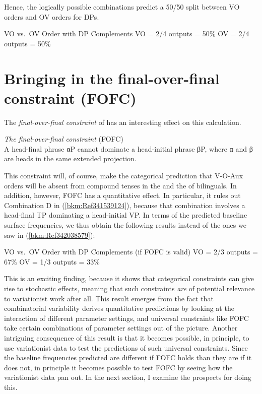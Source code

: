 \documentclass[output=paper]{langsci/langscibook}
\begin{document}
Hence, the logically possible combinations predict a 50/50 split between VO
orders and OV orders for DPs.

\ea\label{bkm:Ref342038579}VO vs.\ OV Order with DP Complements
    \sn VO = 2/4 outputs = 50\%
    \sn OV = 2/4 outputs = 50\%
\z

\section{Bringing in the final-over-final constraint (FOFC)}\label{sec-30:key:2}

The \emph{final-over-final constraint} of \textcite[171]{BibHolRob2014} has an
interesting effect on this calculation.

\ea \emph{The final-over-final constraint} (FOFC)\\
    A head-final phrase αP cannot dominate a head-initial phrase βP, where α
    and β are heads in the same extended projection.
\z

This constraint will, of course, make the categorical prediction that V-O-Aux
orders will be absent from compound tenses in the  and the  of
bilinguals.  In addition, however, \gls{FOFC} has a quantitative effect.  In
particular, it rules out Combination D in (\ref{bkm:Ref341539124}), because
that combination involves a head-final TP dominating a head-initial VP.  In
terms of the predicted baseline surface frequencies, we thus obtain the
following results instead of the ones we saw in (\ref{bkm:Ref342038579}):

\ea VO vs.\ OV Order with DP Complements (if \gls{FOFC} is valid)
    \sn VO = 2/3 outputs = 67\%
    \sn OV = 1/3 outputs = 33\%
\z

This is an exciting finding, because it shows that categorical constraints can
give rise to stochastic effects, meaning that such constraints \emph{are} of
potential relevance to variationist work after all.  This result emerges from
the fact that combinatorial variability derives quantitative predictions by
looking at the interaction of different parameter settings, and universal
constraints like \gls{FOFC} take certain combinations of parameter settings out of
the picture.  Another intriguing consequence of this result is that it becomes
possible, in principle, to use variationist data to test the predictions of
such universal constraints.  Since the baseline frequencies predicted are
different if \gls{FOFC} holds than they are if it does not, in principle it becomes
possible to test \gls{FOFC} by seeing how the variationist data pan out.  In the next
section, I examine the prospects for doing this.
\end{document}
